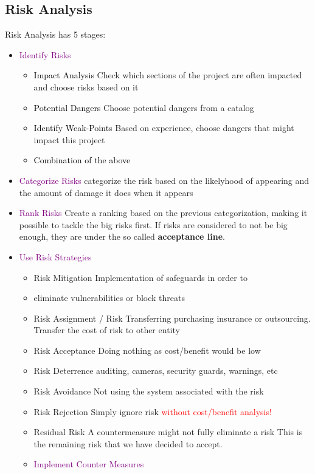 \documentclass[main.tex,fontsize=12pt,paper=a4,paper=landscape,DIV=calc,]{scrartcl}
\begin{document}
\begin{multicols*}{2}
\subsection{Risk Analysis}
Risk Analysis has 5 stages: \newline
\begin{itemize}
\item \textcolor{purple}{Identify Risks}
  \begin{itemize}
  \item \textcolor{black}{Impact Analysis}\newline
    Check which sections of the project are often impacted and choose risks based on it
  \item \textcolor{black}{Potential Dangers}\newline
    Choose potential dangers from a catalog
  \item \textcolor{black}{Identify Weak-Points}\newline
    Based on experience, choose dangers that might impact this project
  \item \textcolor{black}{Combination of the above}
  \end{itemize} 
\item \textcolor{purple}{Categorize Risks}
  categorize the risk based on the likelyhood of appearing and the amount of damage it does when it appears
\item \textcolor{purple}{Rank Risks}\newline 
  Create a ranking based on the previous categorization, making it possible to tackle the big risks first.\newline
  If risks are considered to not be big enough, they are under the so called \textbf{acceptance line}.
\item \textcolor{purple}{Use Risk Strategies}\newline 
\begin{itemize}
\item Risk Mitigation Implementation of safeguards in order to
\item eliminate vulnerabilities or block threats
\item Risk Assignment / Risk Transferring \newline
  purchasing insurance or outsourcing. Transfer the cost of risk to other entity
\item Risk Acceptance Doing nothing as cost/benefit would be low
\item Risk Deterrence auditing, cameras, security guards, warnings, etc
\item Risk Avoidance Not using the system associated with the risk
\item Risk Rejection Simply ignore risk \textcolor{red}{without cost/benefit analysis!}
\item Residual Risk A countermeasure might not fully eliminate a risk\newline 
  This is the remaining risk that we have decided to accept.
\item \textcolor{purple}{Implement Counter Measures}
\end{itemize} 
\end{itemize} 


\end{multicols*}
\end{document}
